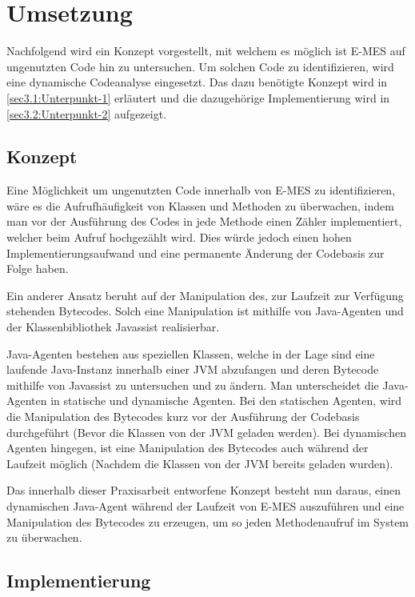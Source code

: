 \chapter{Umsetzung\label{chap3:Drittes-Kapitel}}

Nachfolgend wird ein Konzept vorgestellt, mit welchem es möglich ist E-MES auf ungenutzten Code hin zu untersuchen. Um solchen Code zu identifizieren, wird eine dynamische Codeanalyse eingesetzt. Das dazu benötigte Konzept wird in \autoref{sec3.1:Unterpunkt-1} erläutert und die dazugehörige Implementierung wird in \autoref{sec3.2:Unterpunkt-2} aufgezeigt.


\section{Konzept\label{sec3.1:Unterpunkt-1}}

Eine Möglichkeit um ungenutzten Code innerhalb von E-MES zu identifizieren, wäre es die Aufrufhäufigkeit von Klassen und Methoden zu überwachen, indem man vor der Ausführung des Codes in jede Methode einen Zähler implementiert, welcher beim Aufruf hochgezählt wird. Dies würde jedoch einen hohen Implementierungsaufwand und eine permanente Änderung der Codebasis zur Folge haben.

Ein anderer Ansatz beruht auf der Manipulation des, zur Laufzeit zur Verfügung stehenden Bytecodes. Solch eine Manipulation ist mithilfe von Java-Agenten und der Klassenbibliothek Javassist realisierbar.

Java-Agenten bestehen aus speziellen Klassen, welche in der Lage sind eine laufende Java-Instanz innerhalb einer JVM \glqq abzufangen\grqq{} und deren Bytecode mithilfe von Javassist zu untersuchen und zu ändern. Man unterscheidet die Java-Agenten in statische und dynamische Agenten. Bei den statischen Agenten, wird die Manipulation des Bytecodes kurz vor der Ausführung der Codebasis durchgeführt (Bevor die Klassen von der JVM geladen werden). Bei dynamischen Agenten hingegen, ist eine Manipulation des Bytecodes auch während der Laufzeit möglich (Nachdem die Klassen von der JVM bereits geladen wurden). \cite{ManojDebnath.2020}

Das innerhalb dieser Praxisarbeit entworfene Konzept besteht nun daraus, einen dynamischen Java-Agent während der Laufzeit von E-MES auszuführen und eine Manipulation des Bytecodes zu erzeugen, um so jeden Methodenaufruf im System zu überwachen.

\section{Implementierung\label{sec3.2:Unterpunkt-2}}

